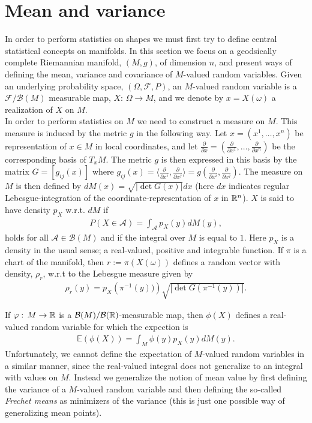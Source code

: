\section{Mean and variance}
\label{sec:mean_and_variance}

In order to perform statistics on shapes we must first try to define central statistical concepts on manifolds. In this section we focus on a geodsically complete Riemannian manifold, $(M, g)$, of dimension $n$, and present ways of defining the mean, variance and covariance of $M$-valued random variables. Given an underlying probability space, $(\Omega, \mathcal{F}, P)$, an $M$-valued random variable is a $\mathcal{F}/\mathcal{B}(M)$ measurable map, $X: \, \Omega \rightarrow M$, and we denote by $x = X(\omega)$ a realization of $X$ on $M$.\\[0.2 cm]
In order to perform statistics on $M$ we need to construct a measure on $M$. This measure is induced by the metric $g$ in the following way. Let $x = (x^1, \ldots , x^n)$ be representation of $x \in M$ in local coordinates, and let $\frac{\partial}{\partial x} = (\frac{\partial}{\partial x^1}, \ldots , \frac{\partial}{\partial x^n})$ be the corresponding basis of $T_x M$. The metric $g$ is then expressed in this basis by the matrix $G = [g_{ij}(x)]$ where $g_{ij}(x) = \langle \frac{\partial}{\partial x^i} , \frac{\partial}{\partial x^j} \rangle = g\left(\frac{\partial}{\partial x^i}, \frac{\partial}{\partial x^j}\right)$. The measure on $M$ is then defined by $d M(x) = \sqrt{\left| \det G(x) \right|} dx$ (here $dx$ indicates regular Lebesgue-integration of the coordinate-representation of $x$ in $\mathbb{R}^n$). $X$ is said to have density $p_X$ w.r.t. $d M$ if
\begin{align*}
P(X \in \mathcal{A}) = \int_{\mathcal{A}} p_X(y) d M(y),
\end{align*}
holds for all $\mathcal{A} \in \mathcal{B}(M)$ and if the integral over $M$ is equal to $1$. Here
$p_X$ is a density in the usual sense; a real-valued, positive and integrable function. If $\pi$ is a chart of the manifold, then $r := \pi(X(\omega))$ defines a random vector with density, $\rho_r$, w.r.t to the Lebesgue measure given by 
\begin{align*}
\rho_r (y) = p_X \left(\pi^{-1}(y))\right) \sqrt{\left| \det G\left(\pi^{-1}(y)\right) \right|}. 
\end{align*}

If $\varphi: \, M \rightarrow \mathbb{R}$ is a $\mathcal{B}(M)/ \mathcal{B}(\mathbb{R})$-measurable map, then $\phi(X)$ defines a real-valued random variable for which the expection is
\begin{align*}
\mathbb{E} (\phi(X)) = \int_M \phi(y) p_X(y) d M(y).
\end{align*}
Unfortunately, we cannot define the expectation of $M$-valued random variables in a similar manner, since the real-valued integral does not generalize to an integral with values on $M$. Instead we generalize the notion of mean value by first defining the variance of a $M$-valued random variable and then defining the so-called \textit{Frechet means} as minimizers of the variance (this is just one possible way of generalizing mean points). 


